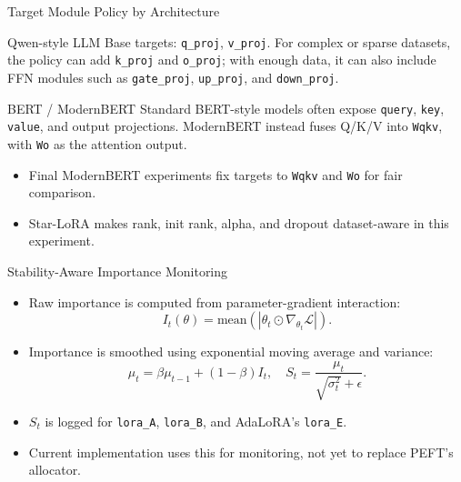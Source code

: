 \begin{frame}{Target Module Policy by Architecture}
\small
\begin{block}{Qwen-style LLM}
Base targets: \texttt{q\_proj}, \texttt{v\_proj}. For complex or sparse datasets, the policy can add \texttt{k\_proj} and \texttt{o\_proj}; with enough data, it can also include FFN modules such as \texttt{gate\_proj}, \texttt{up\_proj}, and \texttt{down\_proj}.
\end{block}

\begin{block}{BERT / ModernBERT}
Standard BERT-style models often expose \texttt{query}, \texttt{key}, \texttt{value}, and output projections. ModernBERT instead fuses Q/K/V into \texttt{Wqkv}, with \texttt{Wo} as the attention output.
\end{block}

\begin{itemize}
  \item Final ModernBERT experiments fix targets to \texttt{Wqkv} and \texttt{Wo} for fair comparison.
  \item Star-LoRA makes rank, init rank, alpha, and dropout dataset-aware in this experiment.
\end{itemize}
\end{frame}

\begin{frame}{Stability-Aware Importance Monitoring}
\small
\begin{itemize}
  \item Raw importance is computed from parameter-gradient interaction:
  \[
    I_t(\theta)
    =
    \mathrm{mean}
    \left(
      |\theta_t \odot \nabla_{\theta_t}\mathcal{L}|
    \right).
  \]
  \item Importance is smoothed using exponential moving average and variance:
  \[
    \mu_t = \beta\mu_{t-1} + (1-\beta)I_t,
    \quad
    S_t = \frac{\mu_t}{\sqrt{\sigma_t^2}+\epsilon}.
  \]
  \item \(S_t\) is logged for \texttt{lora\_A}, \texttt{lora\_B}, and AdaLoRA's \texttt{lora\_E}.
  \item Current implementation uses this for monitoring, not yet to replace PEFT's allocator.
\end{itemize}
\end{frame}

